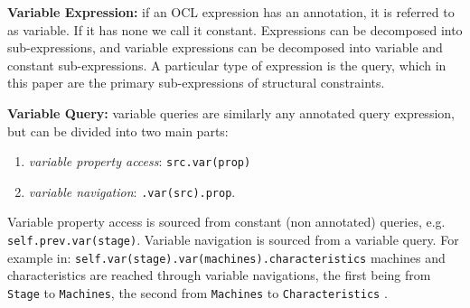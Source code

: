 \noindent \textbf{Variable Expression:} if an OCL expression has an annotation, it is referred to as variable. If it has none we call it constant. Expressions can be decomposed into sub-expressions, and variable expressions can be decomposed into variable and constant sub-expressions.
A particular type of expression is the query, which in this paper are the primary sub-expressions of structural constraints.


\noindent \textbf{Variable Query:}
variable queries are similarly any annotated query expression, but can be divided into two main parts: 
\begin{enumerate}
    \item \emph{variable property access}: \texttt{src.var(prop)} 
    \item \emph{variable navigation}: \texttt{.var(src).prop}.
\end{enumerate}
Variable property access is sourced from constant (non annotated) queries, e.g. \texttt{self.prev.var(stage)}.
Variable navigation is sourced from a variable query. 
For example in: \texttt{self.var(stage).var(machines).characteristics} machines and characteristics are reached through variable navigations, the first being from \texttt{Stage} to \texttt{Machines}, the second from \texttt{Machines} to \texttt{Characteristics} .
